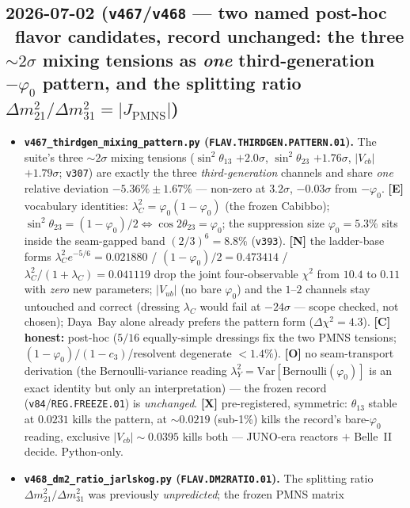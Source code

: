 \subsection*{2026-07-02 (\texttt{v467}/\texttt{v468} --- two named post-hoc \mO\ flavor candidates, record unchanged: the three ${\sim}2\sigma$ mixing tensions as \emph{one} third-generation $-\varphi_0$ pattern, and the splitting ratio $\Delta m^2_{21}/\Delta m^2_{31}=|J_{\mathrm{PMNS}}|$)}
\begin{itemize}
\item \textbf{\texttt{v467\_thirdgen\_mixing\_pattern.py} (\texttt{FLAV.THIRDGEN.PATTERN.01}).} The suite's
three ${\sim}2\sigma$ mixing tensions ($\sin^2\theta_{13}$ $+2.0\sigma$, $\sin^2\theta_{23}$ $+1.76\sigma$,
$|V_{cb}|$ $+1.79\sigma$; \texttt{v307}) are exactly the three \emph{third-generation} channels and share
\emph{one} relative deviation $-5.36\%\pm1.67\%$ --- non-zero at $3.2\sigma$, $-0.03\sigma$ from $-\varphi_0$.
\textbf{[E]} vocabulary identities: $\lambda_C^2{=}\varphi_0(1{-}\varphi_0)$ (the frozen Cabibbo);
$\sin^2\theta_{23}{=}(1{-}\varphi_0)/2\Leftrightarrow\cos2\theta_{23}{=}\varphi_0$; the suppression size
$\varphi_0{=}5.3\%$ sits inside the seam-gapped band $(2/3)^6{=}8.8\%$ (\texttt{v393}). \textbf{[N]} the
ladder-base forms $\lambda_C^2e^{-5/6}{=}0.021880$ / $(1{-}\varphi_0)/2{=}0.473414$ /
$\lambda_C^2/(1{+}\lambda_C){=}0.041119$ drop the joint four-observable $\chi^2$ from $10.4$ to $0.11$ with
\emph{zero} new parameters; $|V_{ub}|$ (no bare $\varphi_0$) and the $1$--$2$ channels stay untouched and
correct (dressing $\lambda_C$ would fail at $-24\sigma$ --- scope checked, not chosen); Daya~Bay alone already
prefers the pattern form ($\Delta\chi^2{=}4.3$). \textbf{[C] honest:} post-hoc ($5/16$ equally-simple dressings
fix the two PMNS tensions; $(1{-}\varphi_0)/(1{-}c_3)$/resolvent degenerate ${<}1.4\%$). \textbf{[O]} no
seam-transport derivation (the Bernoulli-variance reading $\lambda_Y^2{=}\mathrm{Var}[\mathrm{Bernoulli}(\varphi_0)]$
is an exact identity but only an interpretation) --- the frozen record (\texttt{v84}/\texttt{REG.FREEZE.01})
is \emph{unchanged}. \textbf{[X]} pre-registered, symmetric: $\theta_{13}$ stable at $0.0231$ kills the pattern,
at ${\sim}0.0219$ (sub-1\%) kills the record's bare-$\varphi_0$ reading, exclusive $|V_{cb}|{\sim}0.0395$ kills
both --- JUNO-era reactors $+$ Belle~II decide. Python-only.
\item \textbf{\texttt{v468\_dm2\_ratio\_jarlskog.py} (\texttt{FLAV.DM2RATIO.01}).} The splitting ratio
$\Delta m^2_{21}/\Delta m^2_{31}$ was previously \emph{unpredicted}; the frozen PMNS matrix

\end{itemize}
